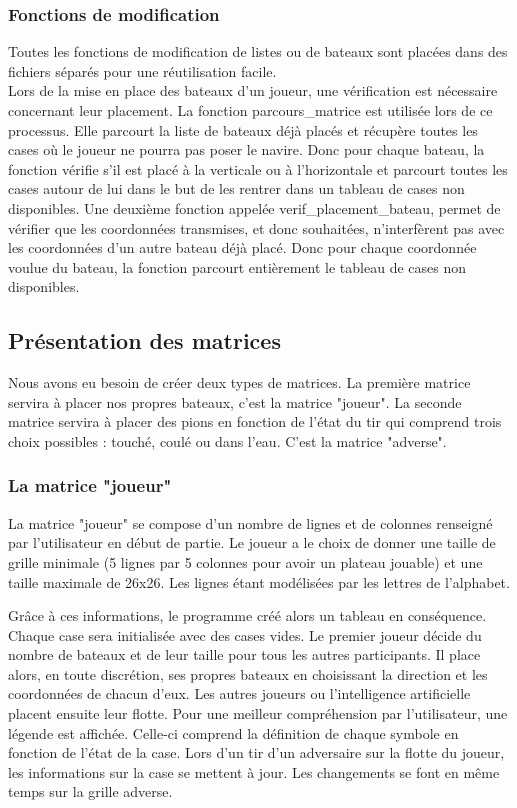 \documentclass[a4paper,12pt]{article}
\begin{document}
\subsubsection{Fonctions de modification}
    Toutes les fonctions de modification de listes ou de bateaux sont placées dans des fichiers séparés pour une réutilisation facile.\\
    
    Lors de la mise en place des bateaux d'un joueur, une vérification est nécessaire concernant leur placement. La fonction parcours\_matrice est utilisée lors de ce processus. Elle parcourt la liste de bateaux déjà placés et récupère toutes les cases où le joueur ne pourra pas poser le navire. Donc pour chaque bateau, la fonction vérifie s'il est placé à la verticale ou à l'horizontale et parcourt toutes les cases autour de lui dans le but de les rentrer dans un tableau de cases non disponibles. 
    \newpage
    Une deuxième fonction appelée verif\_placement\_bateau, permet de vérifier que les coordonnées transmises, et donc souhaitées, n'interfèrent pas avec les coordonnées d'un autre bateau déjà placé. Donc pour chaque coordonnée voulue du bateau, la fonction parcourt entièrement le tableau de cases non disponibles. \\
    
\newpage
\subsection {Présentation des matrices}
    Nous avons eu besoin de créer deux types de matrices. La première matrice servira à placer nos propres bateaux, c'est la matrice "joueur". La seconde matrice servira à placer des pions en fonction de l'état du tir qui comprend trois choix possibles : touché, coulé ou dans l'eau. C'est la matrice "adverse". \\
    \subsubsection{La matrice "joueur"}
        La matrice "joueur" se compose d'un nombre de lignes et de colonnes renseigné par l'utilisateur en début de partie. Le joueur a le choix de donner une taille de grille minimale (5 lignes par 5 colonnes pour avoir un plateau jouable) et une taille maximale de 26x26. Les lignes étant modélisées par les lettres de l'alphabet. 
        
        
        Grâce à ces informations, le programme créé alors un tableau en conséquence. Chaque case sera initialisée avec des cases vides. Le premier joueur décide du nombre de bateaux et de leur taille pour tous les autres participants. Il place alors, en toute discrétion, ses propres bateaux en choisissant la direction et les coordonnées de chacun d'eux. Les autres joueurs ou l'intelligence artificielle placent ensuite leur flotte. Pour une meilleur compréhension par l'utilisateur, une légende est affichée. Celle-ci comprend la définition de chaque symbole en fonction de l'état de la case. Lors d'un tir d'un adversaire sur la flotte du joueur, les informations sur la case se mettent à jour. Les changements se font en même temps sur la grille adverse.\\
\end{document}

